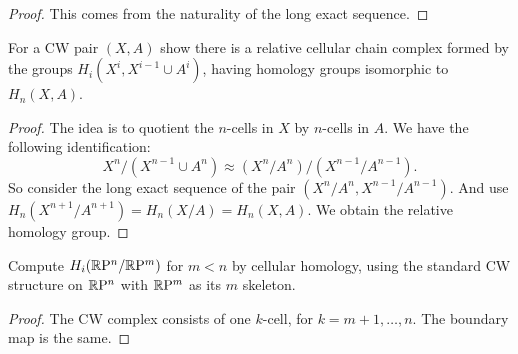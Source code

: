 \begin{proof}
This comes from the naturality of the long exact sequence.
\end{proof}
\begin{exercise}
For a CW pair $(X,A)$ show there is a relative cellular chain complex formed by
the groups $H_i(X^i,X^{i-1}\cup A^i)$, having homology groups isomorphic to $H_n(X,A)$.
\end{exercise}
\begin{proof}
The idea is to quotient the $n$-cells in $X$ by $n$-cells in $A$. We have the following identification:
\[X^n/(X^{n-1}\cup A^n)\approx (X^n/A^n)/(X^{n-1}/A^{n-1}).\]
So consider the long exact sequence of the pair $(X^n/A^n,X^{n-1}/A^{n-1})$. And use $H_n(X^{n+1}/A^{n+1})=H_n(X/A)=H_n(X,A)$. We obtain the relative homology group.
\end{proof}
\begin{exercise}
Compute $H_i(\mathbb{R}\mathrm{P}^n/\mathbb{R}\mathrm{P}^m)$ for $m<n$ by cellular homology, using the standard CW
structure on $\mathbb{R}\mathrm{P}^n$ with $\mathbb{R}\mathrm{P}^m$ as its $m$ skeleton.
\end{exercise}
\begin{proof}
The CW complex consists of one $k$-cell, for $k=m+1,\dots,n$. The boundary map is the same.
\end{proof}


